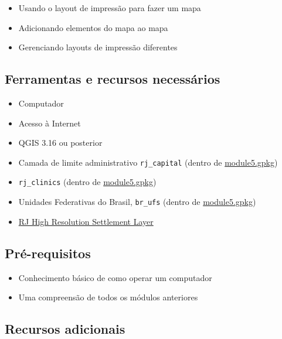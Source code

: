 \documentclass[
  portuguese,
]{krantz}
\providecommand{\tightlist}{%
  \setlength{\itemsep}{0pt}\setlength{\parskip}{0pt}}
\begin{document}
\begin{itemize}
\tightlist
\item
  Usando o layout de impressão para fazer um mapa
\item
  Adicionando elementos do mapa ao mapa
\item
  Gerenciando layouts de impressão diferentes
\end{itemize}

\hypertarget{ferramentas-e-recursos-necessuxe1rios-5}{%
\subsection{Ferramentas e recursos necessários}\label{ferramentas-e-recursos-necessuxe1rios-5}}

\begin{itemize}
\tightlist
\item
  Computador
\item
  Acesso à Internet
\item
  QGIS 3.16 ou posterior
\item
  Camada de limite administrativo \texttt{rj\_capital} (dentro de \href{data/module5.gpkg}{module5.gpkg})
\item
  \texttt{rj\_clinics} (dentro de \href{data/module5.gpkg}{module5.gpkg})
\item
  Unidades Federativas do Brasil, \texttt{br\_ufs} (dentro de \href{data/module5.gpkg}{module5.gpkg})
\item
  \href{data/hrsl_rj_capital_populacao.tif}{RJ High Resolution Settlement Layer}
\end{itemize}

\hypertarget{pruxe9-requisitos-5}{%
\subsection{Pré-requisitos}\label{pruxe9-requisitos-5}}

\begin{itemize}
\tightlist
\item
  Conhecimento básico de como operar um computador
\item
  Uma compreensão de todos os módulos anteriores
\end{itemize}

\hypertarget{recursos-adicionais-5}{%
\subsection{Recursos adicionais}\label{recursos-adicionais-5}}
\end{document}

